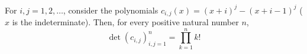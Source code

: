 \documentclass[12pt]{article}
\begin{document}
For $i,j=1,2,\ldots$, consider the polynomials $c_{i,j}(x)=(x+i)^{j}-(x+i-1)^{j}$ ($x$ is the indeterminate). Then, for every positive natural number $n$,
\[ \det (c_{i,j})_{i,j=1}^n = \prod_{k=1}^{n} k! \]
\end{document}
